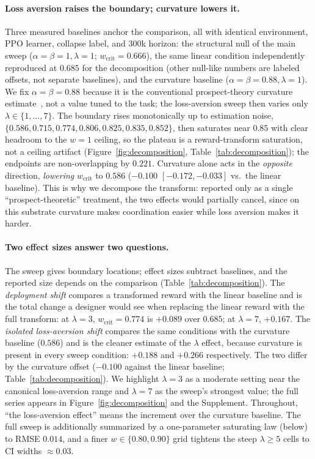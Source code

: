 \documentclass[letterpaper]{article} %
\theoremstyle{plain}
\newcommand{\wcrit}{w_{\mathrm{crit}}}
\begin{document}
\paragraph{Loss aversion raises the boundary; curvature lowers it.}
Three measured baselines anchor the comparison, all with identical environment, PPO learner,
collapse label, and 300k horizon: the structural null of the main sweep
($\alpha{=}\beta{=}1,\lambda{=}1$; $\wcrit=0.666$), the same linear condition independently
reproduced at $0.685$ for the decomposition (other null-like numbers are labeled offsets, not
separate baselines), and the curvature baseline
($\alpha{=}\beta{=}0.88,\lambda{=}1$). We fix $\alpha{=}\beta{=}0.88$ because it is the
conventional prospect-theory curvature estimate~\citep{tversky1992}, not a value tuned to the
task; the loss-aversion sweep then varies only $\lambda\in\{1,\dots,7\}$. The boundary rises
monotonically up to estimation noise, $\{0.586,0.715,0.774,0.806,0.825,0.835,0.852\}$, then
saturates near $0.85$ with clear headroom to the $w{=}1$ ceiling, so the plateau is a
reward-transform saturation, not a ceiling artifact (Figure~\ref{fig:decomposition},
Table~\ref{tab:decomposition}); the endpoints are non-overlapping by $0.221$. Curvature alone acts
in the \emph{opposite} direction, \emph{lowering} $\wcrit$ to $0.586$ ($-0.100$ $[-0.172,-0.033]$
vs.\ the linear baseline). This is why we decompose the transform: reported only as a single
``prospect-theoretic'' treatment, the two effects would partially cancel, since on this substrate
curvature makes coordination easier while loss aversion makes it harder.

\paragraph{Two effect sizes answer two questions.}
The sweep gives boundary locations; effect sizes subtract baselines, and the reported size depends
on the comparison (Table~\ref{tab:decomposition}). The \emph{deployment shift} compares a
transformed reward with the linear baseline and is the total change a designer would see when
replacing the linear reward with the full transform: at $\lambda{=}3$, $\wcrit=0.774$ is $+0.089$
over $0.685$; at $\lambda{=}7$, $+0.167$. The \emph{isolated loss-aversion shift} compares the same
conditions with the curvature baseline ($0.586$) and is the cleaner estimate of the $\lambda$
effect, because curvature is present in every sweep condition: $+0.188$ and $+0.266$ respectively.
The two differ by the curvature offset ($-0.100$ against the linear baseline;
Table~\ref{tab:decomposition}). We highlight
$\lambda{=}3$ as a moderate setting near the canonical loss-aversion range and $\lambda{=}7$ as the
sweep's strongest value; the full series appears in Figure~\ref{fig:decomposition} and the
Supplement. Throughout, ``the loss-aversion effect'' means the increment over the curvature
baseline. The full sweep is additionally summarized by a one-parameter saturating law (below) to
RMSE $0.014$, and a finer $w\in\{0.80,0.90\}$ grid tightens the steep $\lambda{\geq}5$ cells to CI
widths $\approx0.03$.
\end{document}
